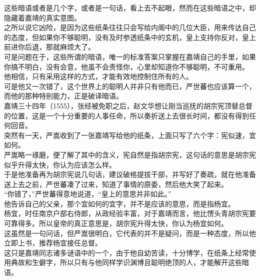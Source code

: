 \begin{multicols}{\theparacolNo}
这些暗语或者是几个字，或者是一句话，看上去不起眼，然而在这些暗语之中，却隐藏着嘉靖的真实意图。\\

之所以说它凶险，是因为这些纸条往往只会写给内阁中的几位大臣，用来传达自己的态度，但如果你不够聪明，没有及时参透纸条中的玄机，皇上支持你反对，皇上前进你后退，那就麻烦大了。\\

可是问题在于，这些所谓的暗语，唯一的标准答案只掌握在嘉靖自己的手里，如果你搞不明白，没有会意，他虽不会责怪你，心里却知道你不够聪明，不可重用。\\

他相信，只有采用这样的方式，才能有效地控制住所有的人。\\

可是他又一次错了，这个世界上的聪明人并非只有他而已，严世蕃也应该算一个，而他的那种特别能力，正是破译暗语。\\

嘉靖三十四年（1555），张经被免职之后，赵文华想让刚当巡抚的胡宗宪顶替总督的位置，这是一个十分重要的人事任命，所以奏折送上去很长时间，都没有得到任何回音。\\

突然有一天，严嵩收到了一张嘉靖写给他的纸条，上面只写了六个字：宪似速，宜如何。\\

严嵩略一琢磨，便了解了其中的含义，宪自然是指胡宗宪，这句话的意思是胡宗宪似乎升得太快，你认为应该怎么样。\\

于是他准备再为胡宗宪说几句话，建议破格提拔干部，并写好了奏疏，就在他准备送上去之前，严世蕃凑了过来，知道了事情的原委，然后他大笑了起来。\\

“你错了，”严世蕃得意地说道，“皇上的意思并非如此。”\\

他告诉自己的父亲，那个宜如何的宜字，并不是应该的意思，而是指杨宜。\\

杨宜，时任南京户部右侍郎，从政经验丰富，对于嘉靖而言，他比愣头青胡宗宪要可靠得多。所以皇帝的真正意思是，胡宗宪升得太快，你认为杨宜如何。\\

这虽然是一句问话，但严嵩很明白，它代表的并不是疑问，而是一种态度，所以他立即上书，推荐杨宜接任总督。\\

这只是嘉靖同志诸多谜语中的一个，由于他自幼苦读，十分博学，在纸条上经常使用典故和生僻字，所以只有与他同样学识渊博且聪明绝顶的人，才能解开这些暗语。\\


\end{multicols}
